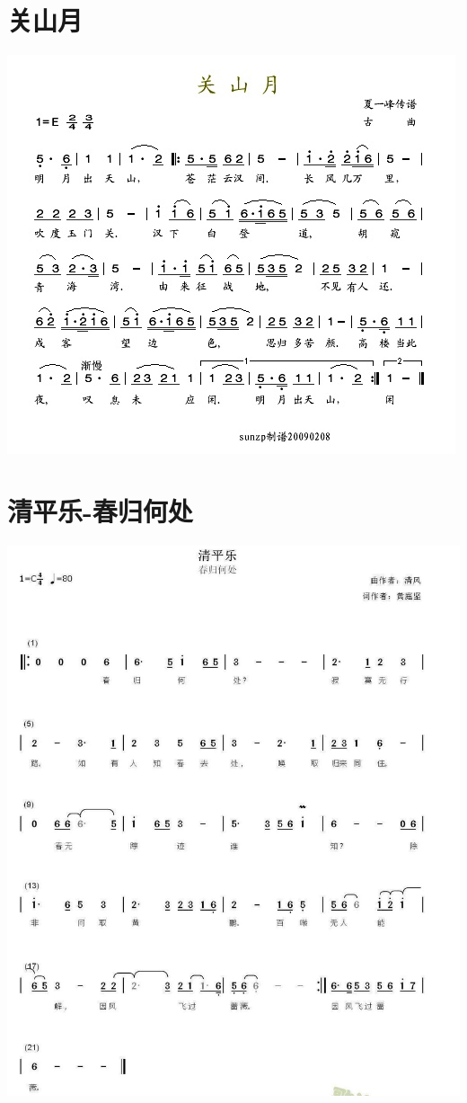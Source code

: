 \documentclass[cn,pad,chinesefont=nofont]{elegantbook}
\begin{document}
\section{关山月}
    \includegraphics[width=\textwidth]{dongxiao/20200411-清平乐-关山月.jpg}
  \section{清平乐-春归何处}
    \includegraphics[width=\textwidth]{dongxiao/20200411-清平乐-春归何处.jpg}
\end{document}
